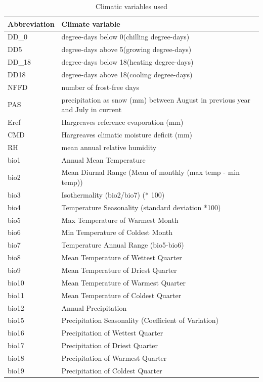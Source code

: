 \documentclass[11pt, oneside]{article}
\begin{document}
\begin{table}[ht]
	\caption[Climate variables]{Climatic variables used }
   \centering
   \begin{tabular}{@{} ll @{}}
      \toprule
   Abbreviation & Climate variable \\
      \midrule
	DD\_0	& degree-days below 0\celsius (chilling degree-days)  \\
	DD5	  & degree-days above 5\celsius (growing degree-days)   \\
	DD\_18	& degree-days below 18\celsius (heating degree-days)  \\
	DD18	& degree-days above 18\celsius (cooling degree-days)  \\
	NFFD	& number of frost-free days                           \\
	PAS	  & precipitation as snow (mm) between August in previous year and July in current  \\
	Eref	& Hargreaves reference evaporation (mm) \\
	CMD	  & Hargreaves climatic moisture deficit (mm) \\
	RH    &	mean annual relative humidity \\
  bio1	&	Annual Mean Temperature	\\
	bio2	&	Mean Diurnal Range (Mean of monthly (max temp - min temp))	\\
	bio3	&	Isothermality (bio2/bio7) (* 100)	\\
	bio4	&	Temperature Seasonality (standard deviation *100)	\\
	bio5	&	Max Temperature of Warmest Month	\\
	bio6	&	Min Temperature of Coldest Month	\\
	bio7	&	Temperature Annual Range (bio5-bio6)	\\
	bio8	&	Mean Temperature of Wettest Quarter	\\
	bio9	&	Mean Temperature of Driest Quarter	\\
	bio10	&	Mean Temperature of Warmest Quarter	\\
	bio11	&	Mean Temperature of Coldest Quarter	\\
	bio12	&	Annual Precipitation	\\
	bio15	&	Precipitation Seasonality (Coefficient of Variation)	\\
	bio16	&	Precipitation of Wettest Quarter	\\
	bio17	&	Precipitation of Driest Quarter	\\
	bio18	&	Precipitation of Warmest Quarter	\\
	bio19	&	Precipitation of Coldest Quarter	\\
	    \bottomrule
   \end{tabular}
   \label{table:TableS_ClimVars}
\end{table}
\end{document}

